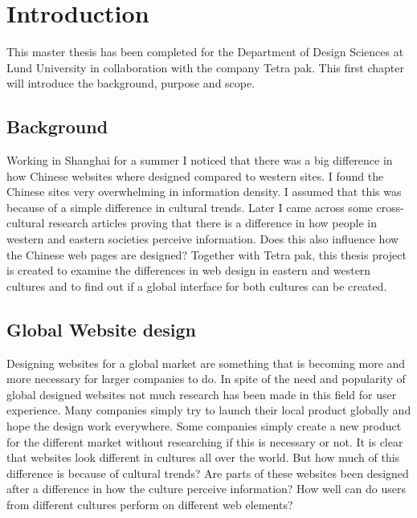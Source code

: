 
\chapter{Introduction} %

\label{Introduction} %


\newcommand{\keyword}[1]{\textbf{#1}}
\newcommand{\tabhead}[1]{\textbf{#1}}
\newcommand{\code}[1]{\texttt{#1}}
\newcommand{\file}[1]{\texttt{\bfseries#1}}
\newcommand{\option}[1]{\texttt{\itshape#1}}



This master thesis has been completed for the Department of Design Sciences at Lund University in collaboration with the company Tetra pak. This first chapter will introduce the background, purpose and scope.

\section{Background}
Working in Shanghai for a summer I noticed that there was a big difference in how Chinese websites where designed compared to western sites. I found the Chinese sites very overwhelming in information density. I assumed that this was because of a simple difference in cultural trends. Later I came across some cross-cultural research articles proving that there is a difference in how people in western and eastern societies perceive information. Does this also influence how the Chinese web pages are designed? Together with Tetra pak, this thesis project is created to examine the differences in web design in eastern and western cultures and to find out if a global interface for both cultures can be created.

\section{Global Website design}
Designing websites for a global market are something that is becoming more and more necessary for larger companies to do. In spite of the need and popularity of global designed websites not much research has been made in this field for user experience. Many companies simply try to launch their local product globally and hope the design work everywhere. Some companies simply create a new product for the different market without researching if this is necessary or not. It is clear that websites look different in cultures all over the world. But how much of this difference is because of cultural trends? Are parts of these websites been designed after a difference in how the culture perceive information? How well can do users from different cultures perform on different web elements?

